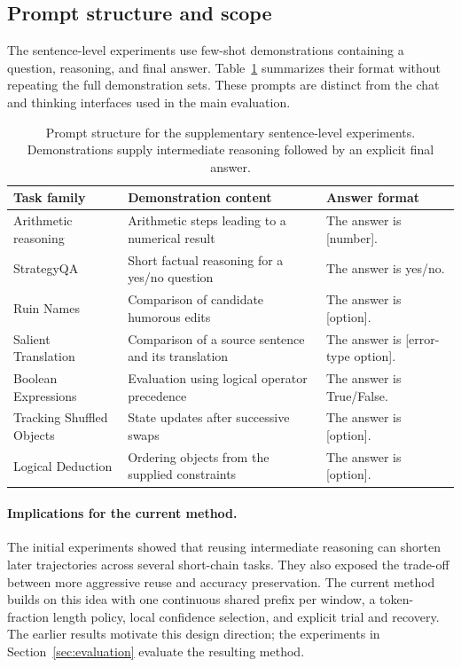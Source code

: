 \subsection{Prompt structure and scope}
The sentence-level experiments use few-shot demonstrations containing a question, reasoning, and final answer. Table~\ref{tab:sentence_prompts} summarizes their format without repeating the full demonstration sets. These prompts are distinct from the chat and thinking interfaces used in the main evaluation.
\begin{table}[!htbp]
\centering\small
\caption{Prompt structure for the supplementary sentence-level experiments. Demonstrations supply intermediate reasoning followed by an explicit final answer.}
\label{tab:sentence_prompts}
\begin{tabularx}{\linewidth}{@{}lXX@{}}
\toprule
Task family & Demonstration content & Answer format\\
\midrule
Arithmetic reasoning & Arithmetic steps leading to a numerical result & The answer is [number].\\
StrategyQA & Short factual reasoning for a yes/no question & The answer is yes/no.\\
Ruin Names & Comparison of candidate humorous edits & The answer is [option].\\
Salient Translation & Comparison of a source sentence and its translation & The answer is [error-type option].\\
Boolean Expressions & Evaluation using logical operator precedence & The answer is True/False.\\
Tracking Shuffled Objects & State updates after successive swaps & The answer is [option].\\
Logical Deduction & Ordering objects from the supplied constraints & The answer is [option].\\
\bottomrule
\end{tabularx}
\end{table}

\paragraph{Implications for the current method.}
The initial experiments showed that reusing intermediate reasoning can shorten later trajectories across several short-chain tasks. They also exposed the trade-off between more aggressive reuse and accuracy preservation. The current method builds on this idea with one continuous shared prefix per window, a token-fraction length policy, local confidence selection, and explicit trial and recovery. The earlier results motivate this design direction; the experiments in Section~\ref{sec:evaluation} evaluate the resulting method.

